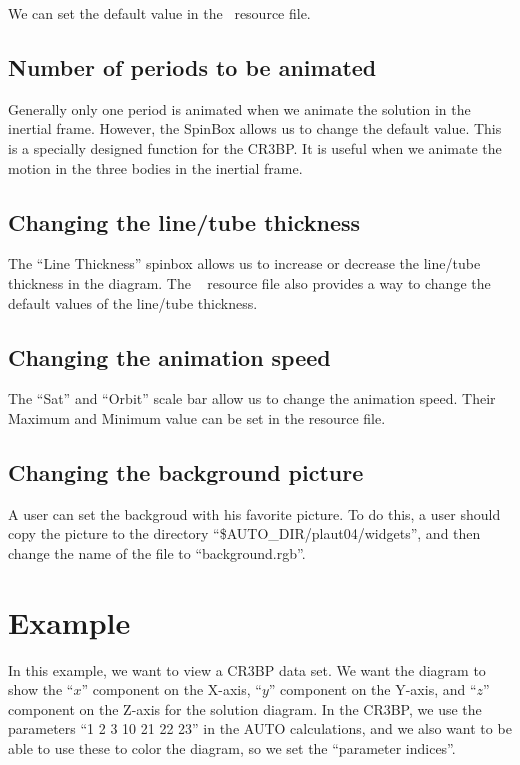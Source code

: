We can set the default value in the \PLAUT~resource file.

\subsection{Number of periods to be animated}

Generally only one period is animated when we animate the solution in the inertial frame.
However, the SpinBox allows us to change the default value. 
 This is a specially designed function for the CR3BP. 
It is useful when  we animate the motion in the three bodies in the inertial frame.

\subsection{Changing the line/tube thickness}

The ``Line Thickness'' spinbox allows us to increase or decrease the line/tube thickness
in the diagram.  The \PLAUT~ resource file also provides a way to change the default values of the
line/tube thickness.

\subsection{Changing the animation speed}

The ``Sat'' and ``Orbit'' scale bar allow us to change the animation speed. 
Their Maximum and Minimum value can be set in the resource file.

\subsection{Changing the background picture}

A user can set the backgroud with his favorite picture. 
To do this, a user should copy the picture to the directory ``\$AUTO\_DIR/plaut04/widgets'', 
and then change the name of the file to ``background.rgb''.

\section{Example}

In this example, we want to view a CR3BP data set.
We want the diagram to show the ``$x$'' component on the X-axis, ``$y$'' component on the Y-axis, and ``$z$'' component on the Z-axis
for the solution diagram. 
In the CR3BP, we use the parameters ``1 2 3 10 21 22 23'' in the AUTO  
calculations, and we also want to be able to use these to color the diagram, so we set the ``parameter indices''.  

